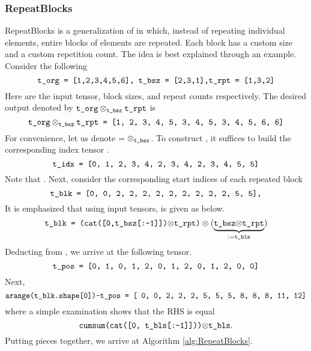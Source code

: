 \subsubsection{RepeatBlocks}
RepeatBlocks is a generalization of  in which, instead of repeating individual elements, entire blocks of elements are repeated. Each block has a custom size and a custom repetition count.  The idea is best explained through an example. Consider the following
 \[
\texttt{t\_org = [1,2,3,4,5,6], t\_bsz = [2,3,1],t\_rpt = [1,3,2]}
 \]
Here  are the input tensor, block sizes, and repeat counts respectively. The desired output denoted by $\texttt{t\_org} \otimes_{\texttt{t\_bsz}}\texttt{t\_rpt}$ is 
\[
\texttt{t\_org} \otimes_{\texttt{t\_bsz}}\texttt{t\_rpt = [1, 2, 3, 4, 5, 3, 4, 5, 3, 4, 5, 6, 6]}
\]
For convenience, let us denote  =  $\otimes_{\texttt{t\_bsz}}$.
To construct , it suffices to build the corresponding index tensor .
\[
\texttt{t\_idx = [0, 1, 2, 3, 4, 2, 3, 4, 2, 3, 4, 5, 5]}
\]
Note that . Next, consider the corresponding start indices of each repeated block 
\[
\texttt{t\_blk = [0, 0, 2, 2, 2, 2, 2, 2, 2, 2, 2, 5, 5],}
\]
It is emphasized that using input tensors,  is given as below.
\[
 \texttt{t\_blk = (cat([0,t\_bsz[:-1]])$\otimes$\texttt{t\_rpt})}\otimes (\underbrace{\texttt{t\_bsz$\otimes$t\_rpt}}_{:=\texttt{t\_bls}}) 
\]
Deducting  from , we arrive at the following tensor.
\[
\texttt{t\_pos = [0, 1, 0, 1, 2, 0, 1, 2, 0, 1, 2, 0, 0]}
\]
Next, 
\[
\texttt{arange(t\_blk.shape[0])-t\_pos = [ 0,  0,  2,  2,  2,  5,  5,  5,  8,  8,  8, 11, 12]}
\]
 where a simple examination shows that the RHS is equal
\[
\texttt{cumsum(cat([0, t\_bls[:-1]]))$\otimes$t\_bls}.
\]
Putting pieces together, we arrive at Algorithm \ref{alg:RepeatBlocks}.
